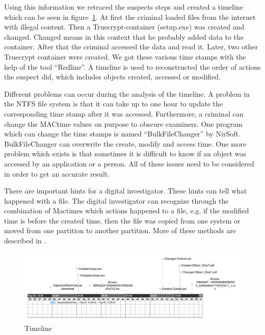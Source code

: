 Using this information we retraced the suspects steps and created a timeline which can be seen in figure~\ref{fig:timeline}.
At first the criminal loaded files from the internet with illegal content. 
Then a Truecrypt-container (setup.exe) was created and changed. 
Changed means in this context that he probably added data to the container.
After that the criminal accessed the data and read it. 
Later, two other Truecrypt container were created. 
We got these various time stamps with the help of the tool “Redline”. 
A timeline is used to reconstructed the order of actions the suspect did, which includes objects created, accessed or modified.

Different problems can occur during the analysis of the timeline.
A problem in the NTFS file system is that it can take up to one hour to update the corresponding time stamp after it was accessed.\cite{FileTimes} 
Furthermore, a criminal can change the MACtime values on purpose to obscure examiners. 
One program which can change the time stamps is named “BulkFileChanger” by NirSoft.\cite{BulkFileChanger}
BulkFileChanger can overwrite the create, modify and access time. 
One more problem which exists is that sometimes it is difficult to know if an object was accessed by an application or a person. 
All of these issues need to be considered in order to get an accurate result. 

There are important hints for a digital investigator. 
These hints can tell what happened with a file. 
The digital investigator can recognize through the combination of Mactimes which actions happened to a file, e.g. if the modified time is before the created time, then the file was copied from one system or moved from one partition to another partition. 
More of these methods are described in \cite{alazab2009effective}.

\begin{figure}[tbph]
	\centering
		\includegraphics[width=\textwidth]{graphics/Timeline.pdf} 	
	\caption{Timeline}
	\label{fig:timeline}
\end{figure}
